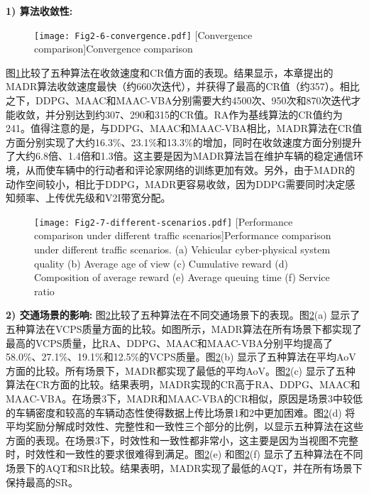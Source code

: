 \textbf{1) 算法收敛性:}
\begin{figure}[b]
\centering
  \texttt{[image: Fig2-6-convergence.pdf]}
  [Convergence comparison]{Convergence comparison}
  \label{fig 2-6}
\end{figure} 
图\ref{fig 2-6}比较了五种算法在收敛速度和CR值方面的表现。结果显示，本章提出的MADR算法收敛速度最快（约660次迭代），并获得了最高的CR值（约357）。相比之下，DDPG、MAAC和MAAC-VBA分别需要大约4500次、950次和870次迭代才能收敛，并分别达到约307、290和315的CR值。RA作为基线算法的CR值约为241。值得注意的是，与DDPG、MAAC和MAAC-VBA相比，MADR算法在CR值方面分别实现了大约16.3\%、23.1\%和13.3\%的增加，同时在收敛速度方面分别提升了大约6.8倍、1.4倍和1.3倍。这主要是因为MADR算法旨在维护车辆的稳定通信环境，从而使车辆中的行动者和评论家网络的训练更加有效。另外，由于MADR的动作空间较小，相比于DDPG，MADR更容易收敛，因为DDPG需要同时决定感知频率、上传优先级和V2I带宽分配。

\begin{figure}[h]
  \centering
  \texttt{[image: Fig2-7-different-scenarios.pdf]}
  [Performance comparison under different traffic scenarios]{Performance comparison under different traffic scenarios. (a) Vehicular cyber-physical system quality (b) Average age of view (c) Cumulative reward (d) Composition of average reward (e) Average queuing time (f) Service ratio}
  \label{fig 2-7}
\end{figure}

\textbf{2) 交通场景的影响:}
图\ref{fig 2-7}比较了五种算法在不同交通场景下的表现。图\ref{fig 2-7}(a) 显示了五种算法在VCPS质量方面的比较。如图所示，MADR算法在所有场景下都实现了最高的VCPS质量，比RA、DDPG、MAAC和MAAC-VBA分别平均提高了58.0\%、27.1\%、19.1\%和12.5\%的VCPS质量。图\ref{fig 2-7}(b) 显示了五种算法在平均AoV方面的比较。所有场景下，MADR都实现了最低的平均AoV。图\ref{fig 2-7}(c) 显示了五种算法在CR方面的比较。结果表明，MADR实现的CR高于RA、DDPG、MAAC和MAAC-VBA。在场景3下，MADR和MAAC-VBA的CR相似，原因是场景3中较低的车辆密度和较高的车辆动态性使得数据上传比场景1和2中更加困难。图\ref{fig 2-7}(d) 将平均奖励分解成时效性、完整性和一致性三个部分的比例，以显示五种算法在这些方面的表现。在场景3下，时效性和一致性都非常小，这主要是因为当视图不完整时，时效性和一致性的要求很难得到满足。图\ref{fig 2-7}(e) 和图\ref{fig 2-7}(f) 显示了五种算法在不同场景下的AQT和SR比较。结果表明，MADR实现了最低的AQT，并在所有场景下保持最高的SR。


